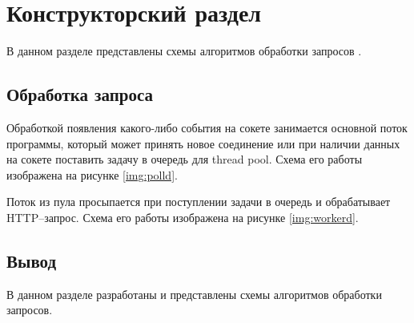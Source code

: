 \chapter{Конструкторский раздел}

В данном разделе представлены схемы алгоритмов обработки запросов .

\section{Обработка запроса}

Обработкой появления какого-либо события на сокете занимается основной поток программы, который может принять новое соединение или при наличии данных на сокете поставить задачу в очередь для thread pool. Схема его работы изображена на рисунке \ref{img:polld}.

\FloatBarrier


Поток из пула просыпается при поступлении задачи в очередь и обрабатывает HTTP--запрос. Схема его работы изображена на рисунке \ref{img:workerd}.

\FloatBarrier

\section*{Вывод}

В данном разделе разработаны и представлены схемы алгоритмов обработки запросов.